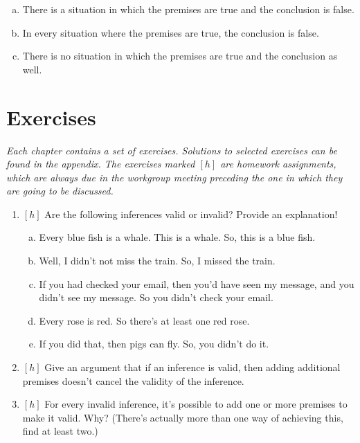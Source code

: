 \begin{enumerate}[\thesection.1]
\begin{enumerate}[(a)]
				\item There is a situation in which the premises are true and the conclusion is false.
				
				\item In every situation where the premises are true, the conclusion is false.
															
				\item There is no situation in which the premises are true and the conclusion as well.
							
			\end{enumerate}


	\end{enumerate}
	
\section{Exercises}

\emph{Each chapter contains a set of exercises. Solutions to selected exercises can be found in the appendix. The exercises marked $[h]$ are homework assignments, which are always due in the workgroup meeting preceding the one in which they are going to be discussed.}

	\begin{enumerate}[\thesection.1]

		\item $[h]$ Are the following inferences valid or invalid? Provide an explanation!

			\begin{enumerate}[(a)]
			
				\item Every blue fish is a whale. This is a whale. So, this is a blue fish. 
			
				\item Well, I didn't not miss the train. So, I missed the train.
			
				\item If you had checked your email, then you'd have seen my message, and you didn't see my message. So you didn't check your email. 

				\item Every rose is red. So there's at least one red rose.
				
				\item If you did that, then pigs can fly. So, you didn't do it.

			\end{enumerate}
			
		\item $[h]$ Give an argument that if an inference is valid, then adding additional premises doesn't cancel the validity of the inference.
			
		\item $[h]$ For every invalid inference, it's possible to add one or more premises to make it valid. Why? (There's actually more than one way of achieving this, find at least two.)

	\end{enumerate}
	
